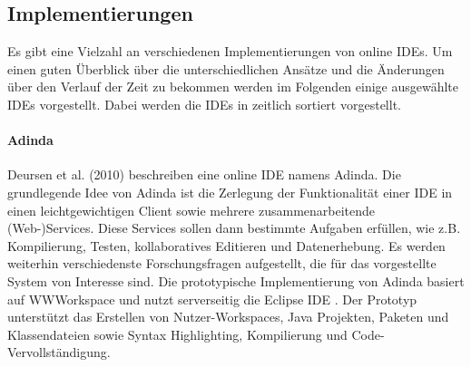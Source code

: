 \subsection{Implementierungen}\label{section:stand-der-technik:literaturrecherche:implementierungen}

Es gibt eine Vielzahl an verschiedenen Implementierungen von online IDEs. Um einen guten Überblick über die unterschiedlichen Ansätze und die Änderungen über den Verlauf der Zeit zu bekommen werden im Folgenden einige ausgewählte IDEs vorgestellt. Dabei werden die IDEs in zeitlich sortiert vorgestellt.

\paragraph{Adinda}
Deursen et al. (2010) \cite{van_deursen_adinda_2010} beschreiben eine online IDE namens Adinda. Die grundlegende Idee von Adinda ist die Zerlegung der Funktionalität einer IDE in einen leichtgewichtigen Client sowie mehrere zusammenarbeitende (Web-)Services. Diese Services sollen dann bestimmte Aufgaben erfüllen, wie z.B. Kompilierung, Testen, kollaboratives Editieren und Datenerhebung. Es werden weiterhin verschiedenste Forschungsfragen aufgestellt, die für das vorgestellte System von Interesse sind. Die prototypische Implementierung von Adinda basiert auf WWWorkspace \cite{ryan_web_2007} und nutzt serverseitig die Eclipse IDE \cite{noauthor_eclipse_nodate}. Der Prototyp unterstützt das Erstellen von Nutzer-Workspaces, Java Projekten, Paketen und Klassendateien sowie Syntax Highlighting, Kompilierung und Code-Vervollständigung.


